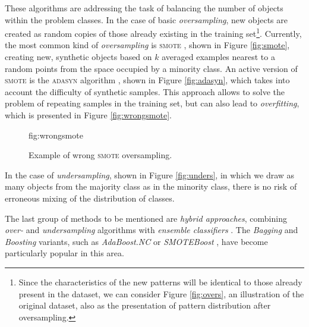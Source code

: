 \documentclass[pmlr]{jmlr}
\begin{document}
These algorithms are addressing the task of balancing the number of objects within the problem classes. In the case of basic \emph{oversampling}, new objects are created as random copies of those already existing in the training set\footnote{Since the characteristics of the new patterns will be identical to those already present in the dataset, we can consider Figure \ref{fig:overs}, an illustration of the original dataset, also as the presentation of pattern distribution after oversampling.}. Currently, the most common kind of \emph{oversampling}  is \textsc{smote} \citep{Cha2002}, shown in Figure \ref{fig:smote}, creating new, synthetic objects based on $k$ averaged examples nearest to a random points from the space occupied by a minority class. An active version of \textsc{smote} is the \textsc{adasyn} algorithm \citep{He:2008}, shown in Figure \ref{fig:adasyn}, which takes into account the difficulty of synthetic samples. This approach allows to solve the problem of repeating samples in the training set, but can also lead to \emph{overfitting}, which is presented in Figure \ref{fig:wrongsmote}.

\begin{figure}[htbp]
\floatconts
  {fig:wrongsmote}
  {\caption{Example of wrong \textsc{smote} oversampling.}}
  {%
    \qquad
  }
\end{figure}

In the case of \emph{undersampling}, shown in Figure \ref{fig:unders}, in which we draw as many objects from the majority class as in the minority class, there is no risk of erroneous mixing of the distribution of classes.

The last group of methods to be mentioned are \emph{hybrid approaches}, combining \emph{over-} and \emph{undersampling} algorithms with \emph{ensemble classifiers} \citep{Galar:2012}. The \emph{Bagging} and \emph{Boosting} variants, such as \emph{AdaBoost.NC} \citep{Wang:2010} or \emph {SMOTEBoost} \citep{Chawla:2003}, have become particularly popular in this area.
\end{document}
